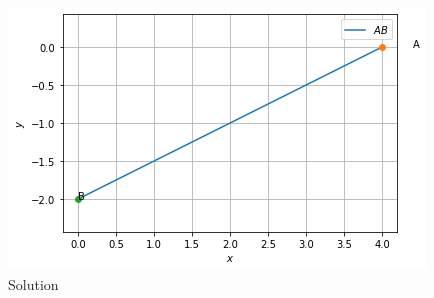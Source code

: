 \documentclass[journal,12pt,twocolumn]{IEEEtran}
\begin{document}
\begin{figure}[h]
    \centering
    \includegraphics[width=\columnwidth]{download.png}
    \caption{Solution}
    \label{fig:Fig 2.1}
\end{figure}
\end{document}
